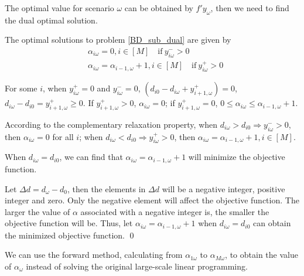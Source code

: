 The optimal value for scenario $\omega$ can be obtained by $f{'} y_{\omega}$, then we need to find the dual optimal solution.


\begin{thm}\label{optimal_sol_sub_dual}
  The optimal solutions to problem \eqref{BD_sub_dual} are given by 
\begin{equation}\label{BD_sub_simplified}
  \begin{aligned}
    & \alpha_{i \omega} =0, i \in [M] \quad \text{if}~  y_{i \omega}^{-} > 0   \\
    & \alpha_{i \omega} = \alpha_{i-1, \omega}+1, i \in [M] \quad \text{if}~ y_{i \omega}^{+} > 0
  \end{aligned}
\end{equation}
\end{thm}

For some $i$, when $y_{i \omega}^{+} = 0$ and $y_{i \omega}^{-} = 0$, $\left(d_{i 0}- d_{i \omega} + y_{i+1, \omega}^{+}\right) = 0$, $d_{i \omega}- d_{i 0} = y_{i+1, \omega}^{+} \geq 0$.
If $y_{i+1, \omega}^{+} > 0$, $\alpha_{i \omega} = 0$;
if $y_{i+1, \omega}^{+} = 0$, $0 \leq \alpha_{i \omega} \leq \alpha_{i-1, \omega} +1$.

\begin{pf}
  According to the complementary relaxation property, when
$d_{i \omega} > d_{i 0} \Rightarrow y_{i \omega}^{-} >0$, then $\alpha_{i \omega} =0$ for all $i$; when $d_{i \omega} < d_{i 0} \Rightarrow y_{i \omega}^{+} >0$, then $\alpha_{i \omega} = \alpha_{i-1,\omega} +1, i \in [M]$. 

When $d_{i \omega} = d_{i 0}$,  we can find that $\alpha_{i \omega} = \alpha_{i-1, \omega} + 1$ will minimize the objective function.

Let $\Delta d = d_{\omega} - d_0$, then the elements in $\Delta d$ will be a negative integer, positive integer and zero. 
Only the negative element will affect the objective function.
The larger the value of $\alpha$ associated with a negative integer is, the smaller the objective function will be. Thus, let $\alpha_{i \omega} = \alpha_{i-1, \omega} + 1$ when $d_{i \omega} = d_{i 0}$ can obtain the minimized objective function.
\qed
\end{pf}

We can use the forward method, calculating from $\alpha_{1 \omega}$ to $\alpha_{M \omega}$, to obtain the value of $\alpha_{\omega}$ instead of solving the original large-scale linear programming.

